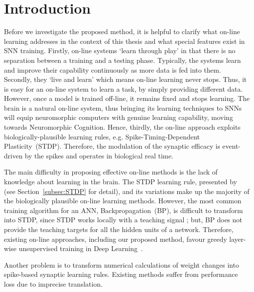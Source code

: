 \section{Introduction}
\label{sec:SRM_intro}
Before we investigate the proposed method, it is helpful to clarify what on-line learning addresses in the context of this thesis and what special features exist in SNN training.
Firstly, on-line systems `learn through play' in that there is no separation between a training and a testing phase.
Typically, the systems learn and improve their capability continuously as more data is fed into them.
Secondly, they `live and learn' which means on-line learning never stops.
Thus, it is easy for an on-line system to learn a \DIFaddbegin {}\DIFaddend task, by simply providing different data.
However, once a model is trained off-line, it remains fixed and stops learning.
The brain is a natural on-line system, thus bringing its learning techniques to SNNs will equip neuromorphic computers with genuine learning capability, moving towards Neuromorphic Cognition.
Hence, thirdly, the on-line approach exploits biologically-plausible learning rules, e.g. Spike-Timing-Dependent Plasticity~(STDP).
Therefore, the modulation of the synaptic efficacy is event-driven by the spikes and operates in biological real time.


The main difficulty in proposing effective on-line methods is the lack of knowledge about learning in the brain.
The STDP learning rule, presented by~\citet{bi1998synaptic} (see Section~\ref{subsec:STDP} for detail), and its variations make up the majority of the biologically plausible on-line learning methods.
However, the most common training algorithm for an ANN, Backpropagation~(BP), is difficult to transform into STDP, since STDP \DIFdelbegin {}\DIFdelend \DIFaddbegin {}\DIFaddend works locally with a teaching signal \DIFaddbegin {}\DIFaddend ; but, BP does not provide the teaching targets for all the hidden units of a network.
Therefore, existing on-line approaches, including our proposed method, favour greedy layer-wise unsupervised training in Deep Learning~\citep{hinton2006fast}.
\DIFaddbegin 

\DIFaddend Another problem is to \DIFdelbegin {}\DIFdelend transform numerical calculations of weight changes into spike-based synaptic learning rules.
Existing methods suffer from performance loss due to imprecise translation.
\DIFdelbegin {}%


